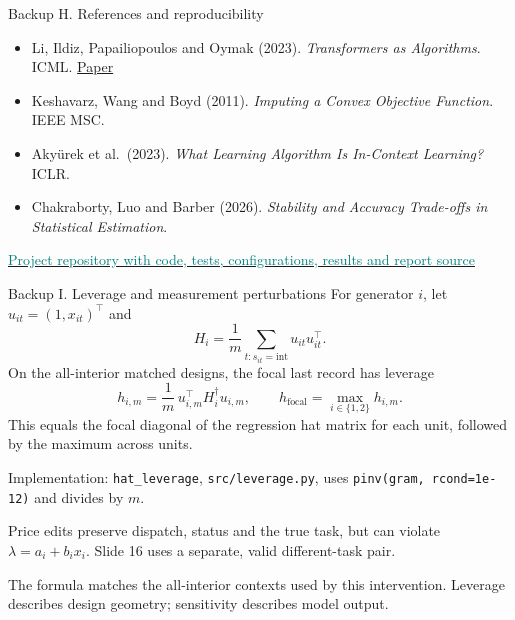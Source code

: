 \documentclass[aspectratio=169,11pt]{beamer}
\newcommand{\source}[1]{\par\vfill{\color{muted}\tiny #1}}
\begin{document}
\begin{frame}[noframenumbering]{Backup H. References and reproducibility}
\footnotesize
\begin{itemize}
\setlength{\itemsep}{3mm}
\item Li, Ildiz, Papailiopoulos and Oymak (2023).
\emph{Transformers as Algorithms}. ICML.
\href{https://proceedings.mlr.press/v202/li23l.html}{Paper}
\item Keshavarz, Wang and Boyd (2011).
\emph{Imputing a Convex Objective Function}. IEEE MSC.
\item Aky\"urek et al.\ (2023).
\emph{What Learning Algorithm Is In-Context Learning?} ICLR.
\item Chakraborty, Luo and Barber (2026).
\emph{Stability and Accuracy Trade-offs in Statistical Estimation}.
\end{itemize}
\vspace{4mm}
\href{https://github.com/feizhanguwaterloo/Stability-and-Information-Sensitivity-in-Transformer-In-Context-Inverse-Learning}
{\textcolor{teal}{Project repository with code, tests, configurations, results and report source}}
\end{frame}

\begin{frame}[noframenumbering]{Backup I. Leverage and measurement perturbations}
\small
For generator \(i\), let \(u_{it}=(1,x_{it})^\top\) and
\[
H_i=\frac1m\sum_{t:s_{it}=\mathrm{int}}u_{it}u_{it}^{\top}.
\]
On the all-interior matched designs, the focal last record has leverage
\[
h_{i,m}=\frac1m\,u_{i,m}^{\top}H_i^\dagger u_{i,m},
\qquad
h_{\mathrm{focal}}=\max_{i\in\{1,2\}}h_{i,m}.
\]
This equals the focal diagonal of the regression hat matrix for each unit,
followed by the maximum across units.
\vspace{3mm}

Implementation: \texttt{hat\_leverage}, \texttt{src/leverage.py},
uses \texttt{pinv(gram, rcond=1e-12)} and divides by \(m\).
\vspace{3mm}

Price edits preserve dispatch, status and the true task, but can violate
\(\lambda=a_i+b_ix_i\). Slide 16 uses a separate, valid different-task pair.
\source{The formula matches the all-interior contexts used by this intervention.
Leverage describes design geometry; sensitivity describes model output.}
\end{frame}
\end{document}
